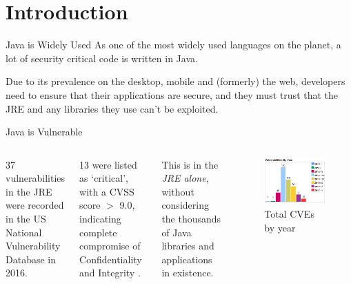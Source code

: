 \section{Introduction}

\begin{frame}{Java is Widely Used}
	As one of the most widely used languages on the planet, a lot of security critical code is written in Java.
	
	Due to its prevalence on the desktop, mobile and (formerly) the web, developers need to ensure that their applications are secure, and they must trust that the JRE and any libraries they use can't be exploited.
\end{frame}

\begin{frame}{Java is Vulnerable}
	\begin{columns}
			37 vulnerabilities in the JRE were recorded in the US National Vulnerability Database in 2016.\newline
			
			13 were listed as `critical', with a CVSS score $ > $ 9.0, indicating complete compromise of Confidentiality and Integrity \cite{nvd:jdk2016cvss9}.\newline
			
			This is in the \textit{JRE alone}, without considering the thousands of Java libraries and applications in existence.
		\begin{figure}
			\includegraphics[scale=0.25]{content/images/cvedetails_vulnsperyear.png}
			\caption{Total CVEs by year \cite{cvedetails:jdk2016}}
		\end{figure}
	\end{columns}	
\end{frame}

